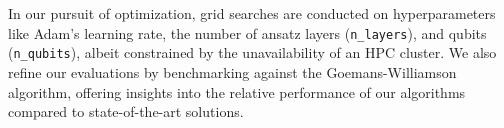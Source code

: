 In our pursuit of optimization, grid searches are conducted on hyperparameters like Adam's learning rate, the number of ansatz layers (\texttt{n\_layers}), and qubits (\texttt{n\_qubits}), albeit constrained by the unavailability of an HPC cluster. We also refine our evaluations by benchmarking against the Goemans-Williamson algorithm, offering insights into the relative performance of our algorithms compared to state-of-the-art solutions. %